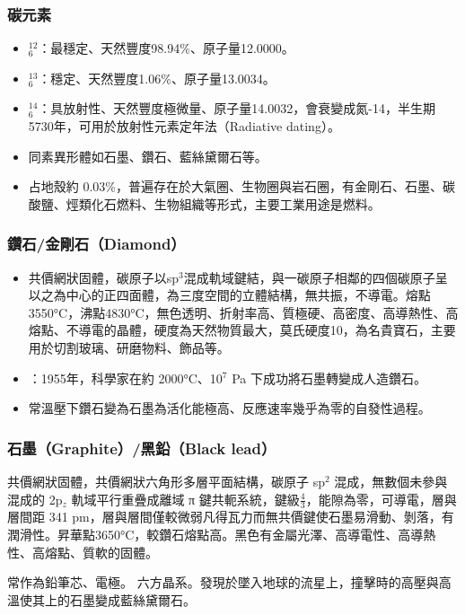 \documentclass[a4paper,12pt]{report}
\begin{document}
\subsubsection{碳元素}
\begin{itemize}
\item $^{12}_6$\rmC：最穩定、天然豐度98.94\%、原子量12.0000。
\item $^{13}_6$\rmC：穩定、天然豐度1.06\%、原子量13.0034。
\item $^{14}_6$\rmC：具放射性、天然豐度極微量、原子量14.0032，會衰變成氮-14，半生期5730年，可用於放射性元素定年法（Radiative dating）。
\item 同素異形體如石墨、鑽石、藍絲黛爾石等。
\item 占地殼約 0.03\%，普遍存在於大氣圈、生物圈與岩石圈，有金剛石、石墨、碳酸鹽、烴類化石燃料、生物組織等形式，主要工業用途是燃料。
\end{itemize}
\subsubsection{鑽石/金剛石（Diamond）}
\begin{itemize}
\item 共價網狀固體，碳原子以sp$^3$混成軌域鍵結，與一碳原子相鄰的四個碳原子呈以之為中心的正四面體，為三度空間的立體結構，無共振，不導電。熔點3550°C，沸點4830°C，無色透明、折射率高、質極硬、高密度、高導熱性、高熔點、不導電的晶體，硬度為天然物質最大，莫氏硬度10，為名貴寶石，主要用於切割玻璃、研磨物料、飾品等。
\item {}：1955年，科學家在約 2000°C、10$^7$ Pa 下成功將石墨轉變成人造鑽石。
\item 常溫壓下鑽石變為石墨為活化能極高、反應速率幾乎為零的自發性過程。
\end{itemize}
\subsubsection{石墨（Graphite）/黑鉛（Black lead）}
\bit
\item 共價網狀固體，共價網狀六角形多層平面結構，碳原子 sp$^2$ 混成，無數個未參與混成的 2p$_z$ 軌域平行重疊成離域 π 鍵共軛系統，鍵級$\frac{4}{3}$，能隙為零，可導電，層與層間距 341 pm，層與層間僅較微弱凡得瓦力而無共價鍵使石墨易滑動、剝落，有潤滑性。昇華點3650°C，較鑽石熔點高。黑色有金屬光澤、高導電性、高導熱性、高熔點、質軟的固體。
\item 常作為鉛筆芯、電極。
\eit
{}
六方晶系。發現於墜入地球的流星上，撞擊時的高壓與高溫使其上的石墨變成藍絲黛爾石。
\end{document}

